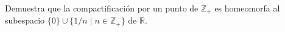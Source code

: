 
 \item Demuestra que la compactificación por un punto de $\mathbb{Z}_{+}$ es homeomorfa al subespacio $\{0\} \cup \{1 / n \mid n \in \mathbb{Z}_{+}\}$ de $\mathbb{R}$.